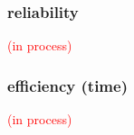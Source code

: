 \subsubsection{reliability}
%
\textcolor{red}{(in process)}

\begin{comment}
compare the Scale Separation Reliability (SSR, an inter-rater reliability measure), coming from CJ methods, with others for other methods

- No intra-rater reliability, also known as test-retest reliability (Verhavert_2018, Reliability_wiki_2022) 
- No Inter-method reliability,  assesses the degree to which test scores are consistent when there is a variation in the methods or instruments used (Verhavert_2018, Reliability_wiki_2022) 
- No comparison of SSR vs the true correlation of the latent scale and entropy measures 
* Justification: (Verhavert_2018, p. 156) " simulation studies could resolve the inconclusiveness regarding the SSR as a correlation with the truth."
\end{comment}
%
%
\subsubsection{efficiency (time)}
%
\textcolor{red}{(in process)}

\begin{comment}
time needed for each judgement based on method from (Coertjens_et_al_2017).

statistical efficiency has been researched on \citet{Leijon_et_al_2019} and \citet{Pritikin_2020} for the bayesian dichotomous BTL model and the ordinal BTL model, respectively.
\end{comment}
